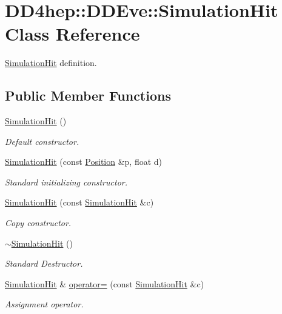 \hypertarget{class_d_d4hep_1_1_d_d_eve_1_1_simulation_hit}{}\section{D\+D4hep\+:\+:D\+D\+Eve\+:\+:Simulation\+Hit Class Reference}
\label{class_d_d4hep_1_1_d_d_eve_1_1_simulation_hit}


\hyperlink{class_d_d4hep_1_1_d_d_eve_1_1_simulation_hit}{Simulation\+Hit} definition.  


\subsection*{Public Member Functions}
\begin{DoxyCompactItemize}
\item 
\hyperlink{class_d_d4hep_1_1_d_d_eve_1_1_simulation_hit_a52422ccbc4cabcf550a4295a3ae69fac}{Simulation\+Hit} ()
\begin{DoxyCompactList}\small\item\em Default constructor. \end{DoxyCompactList}\item 
\hyperlink{class_d_d4hep_1_1_d_d_eve_1_1_simulation_hit_a6374a26cae5bd1a3d4aeca8059872df1}{Simulation\+Hit} (const \hyperlink{namespace_d_d4hep_1_1_geometry_a55083902099d03506c6db01b80404900}{Position} \&p, float d)
\begin{DoxyCompactList}\small\item\em Standard initializing constructor. \end{DoxyCompactList}\item 
\hyperlink{class_d_d4hep_1_1_d_d_eve_1_1_simulation_hit_a611310f4056789d4f00b19755f46636b}{Simulation\+Hit} (const \hyperlink{class_d_d4hep_1_1_d_d_eve_1_1_simulation_hit}{Simulation\+Hit} \&c)
\begin{DoxyCompactList}\small\item\em Copy constructor. \end{DoxyCompactList}\item 
\hyperlink{class_d_d4hep_1_1_d_d_eve_1_1_simulation_hit_affeb47d7d697a8aa4823c6e839e4a8d6}{$\sim$\+Simulation\+Hit} ()
\begin{DoxyCompactList}\small\item\em Standard Destructor. \end{DoxyCompactList}\item 
\hyperlink{class_d_d4hep_1_1_d_d_eve_1_1_simulation_hit}{Simulation\+Hit} \& \hyperlink{class_d_d4hep_1_1_d_d_eve_1_1_simulation_hit_a12089779b1b39ae8803dec22e1f0271e}{operator=} (const \hyperlink{class_d_d4hep_1_1_d_d_eve_1_1_simulation_hit}{Simulation\+Hit} \&c)
\begin{DoxyCompactList}\small\item\em Assignment operator. \end{DoxyCompactList}\end{DoxyCompactItemize}
